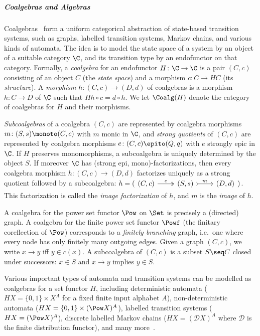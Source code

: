 \documentclass[a4paper,UKenglish, autoref, numberwithinsect, final]{lipics-v2021}
\numberwithin{equation}{section}
\theoremstyle{plain}
\theoremstyle{definition}
\begin{document}
\subparagraph*{Coalgebras and Algebras} 

Coalgebras~\cite{jacobs16,rutten00} form a uniform categorical abstraction of state-based transition systems, such as graphs, labelled transition systems, Markov chains, and various kinds of automata. The idea is to model the state space of a system by an object of a suitable category $\C$, and its transition type by an endofunctor on that category. Formally, a \emph{coalgebra} for an endofunctor $H\colon \C\to \C$ is a pair $(C,c)$ consisting of an object $C$ (the
\emph{state space}) and a morphism $c\colon C\to HC$ (its
\emph{structure}). A \emph{morphism} $h\colon (C,c)\to (D,d)$ of coalgebras is a morphism $h\colon C\to D$ of $\C$ such that $Hh\circ c = d\circ h$. We let $\Coalg(H)$ denote the category of coalgebras for $H$ and their morphisms. 

\emph{Subcoalgebras} of a coalgebra $(C,c)$ are represented by coalgebra morphisms  $m\colon (S,s)\monoto (C,c)$ with $m$ monic in $\C$, and \emph{strong quotients} of $(C,c)$ are represented by coalgebra morphisms $e\colon (C,c)\epito (Q,q)$ with $e$ strongly epic in $\C$. If $H$ preserves monomorphisms, a subcoalgebra is uniquely determined by the object $S$. If moreover $\C$ has (strong epi, mono)-factorizations, then every coalgebra morphism $h\colon (C,c)\to (D,d)$ factorizes uniquely as a strong quotient followed by a subcoalgebra: $h = (\begin{tikzcd} (C,c) \ar[two heads]{r}{e} & (S,s) \ar[tail]{r}{m} & (D,d) \end{tikzcd})$. This factorization is called the \emph{image factorization} of $h$, and $m$ is the \emph{image} of $h$.

\begin{example}[Graphs]\label{ex:coalgebras}
 A coalgebra for the power set functor $\Pow$ on $\Set$ is precisely a (directed) graph. A coalgebra for the finite power set functor $\Powf$ (the finitary coreflection of $\Pow$) corresponds to a \emph{finitely branching} graph, i.e.\ one where every node has only finitely many outgoing edges. Given a graph $(C,c)$, we write $x\to y$ iff $y\in c(x)$. 
%
A subcoalgebra of $(C,c)$ is a subset $S\seq C$ closed under successors: $x\in S$ and $x\to y$ implies $y\in S$.
%
%
%
%
%
%
%
%
\end{example}

\begin{example}
Various important types of automata and transition systems can be modelled as coalgebras for a set functor $H$, including deterministic automata ($HX=\{0,1\}\times X^A$ for a fixed finite input alphabet $A$), non-deterministic automata ($HX=\{0,1\}\times (\Pow X)^A$), labelled transition systems ($HX = (\Pow X)^A$), discrete labelled Markov chains ($HX=(\mathcal{D}X)^A$ where $\mathcal{D}$ is the finite distribution functor), and many more~\cite{jacobs16,rutten00}.
\end{example}
\end{document}
